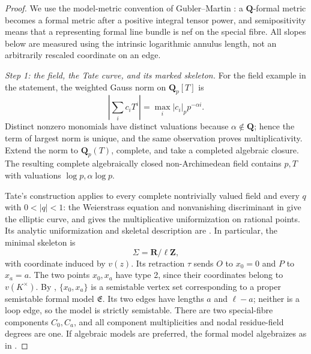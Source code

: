 \begin{proof}
We use the model-metric convention of Gubler--Martin \cite[Introduction and Sections 2--4]{GM19}: a $\mathbf Q$-formal metric becomes a
formal metric after a positive integral tensor power, and semipositivity
means that a representing formal line bundle is nef on the special fibre.
All slopes below are measured using the intrinsic logarithmic annulus
length, not an arbitrarily rescaled coordinate on an edge.

\emph{Step 1: the field, the Tate curve, and its marked skeleton.}
For the field example in the statement, the weighted Gauss norm on
$\mathbf Q_p[T]$ is
\[
 \left|\sum_i c_iT^i\right|
   =\max_i |c_i|_p p^{-\alpha i}.
\]
Distinct nonzero monomials have distinct valuations because
$\alpha\notin\mathbf Q$; hence the term of largest norm is unique,
and the same observation proves multiplicativity. Extend the norm to
$\mathbf Q_p(T)$, complete, and take a completed algebraic closure.
The resulting complete algebraically closed non-Archimedean field
contains $p,T$ with valuations $\log p,\alpha\log p$.

Tate's construction applies to every complete nontrivially valued field
and every $q$ with $0<|q|<1$: the Weierstrass equation and
nonvanishing discriminant in \cite[equations (13)--(18)]{Tate95} give the
elliptic curve, and \cite[Theorem 1]{Tate95} gives the multiplicative
uniformization on rational points. Its analytic uniformization and
skeletal description are \cite[Remark 4.24]{BPR14}. In particular, the minimal
skeleton is
\[
 \Sigma=\mathbf R/\ell\mathbf Z,
\]
with coordinate induced by $v(z)$. Its retraction $\tau$ sends
$O$ to $x_0=0$ and $P$ to $x_a=a$.
The two points $x_0,x_a$ have type 2, since their coordinates belong
to $v(K^\times)$. By \cite[Proposition 3.13(2) and Theorem 4.11]{BPR14},
$\{x_0,x_a\}$ is a semistable vertex set corresponding to a proper
semistable formal model $\mathfrak E$. Its two edges have lengths
$a$ and $\ell-a$; neither is a loop edge, so the model is strictly
semistable. There are two special-fibre components $C_0,C_a$, and
all component multiplicities and nodal residue-field degrees are one.
If algebraic models are preferred, the formal model algebraizes as in
\cite[Remark 3.3]{GJKM19}.


\end{proof}
